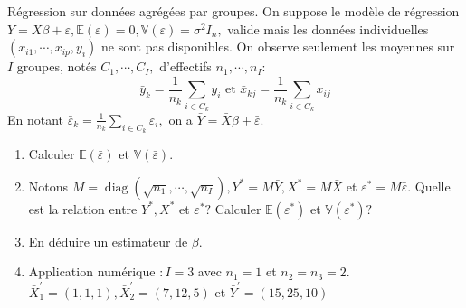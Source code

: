 \documentclass{td_um}
\providecommand{\1}{\mathds{1}}
\begin{document}
\cor{\newpage}

\exo{} Régression sur données agrégées par groupes. On suppose le modèle de régression $Y=X \beta+\varepsilon, \mathbb{E}(\varepsilon)=0, \mathbb{V}(\varepsilon)=\sigma^{2} I_{n},$ valide
mais les données individuelles $\left(x_{i 1}, \cdots, x_{i p}, y_{i}\right)$ ne sont pas disponibles. On observe seulement les moyennes sur $I$ groupes, notés $C_{1}, \cdots, C_{I},$ d'effectifs $n_{1}, \cdots, n_{I}:$
$$
\bar{y}_{k}=\frac{1}{n_{k}} \sum_{i \in C_{k}} y_{i} \text { et } \bar{x}_{k j}=\frac{1}{n_{k}} \sum_{i \in C_{k}} x_{i j}
$$
En notant $\bar{\varepsilon}_{k}=\frac{1}{n_{k}} \sum_{i \in C_{k}} \varepsilon_{i},$ on a $\bar{Y}=\bar{X} \beta+\bar{\varepsilon} .$
\begin{enumerate}
    \item  Calculer $\mathbb{E}(\bar{\varepsilon})$ et $\mathbb{V}(\bar{\varepsilon})$.
    \item  Notons $M=\operatorname{diag}\left(\sqrt{n_{1}}, \cdots, \sqrt{n_{I}}\right), Y^{*}=M \bar{Y}, X^{*}=M \bar{X}$ et $\varepsilon^{*}=M \bar{\varepsilon}$. Quelle est la relation entre $Y^{*}, X^{*}$ et $\varepsilon^{*} ?$ Calculer $\mathbb{E}\left(\varepsilon^{*}\right)$ et $\mathbb{V}\left(\varepsilon^{*}\right) ?$
    \item  En déduire un estimateur de $\beta$.
    \item  Application numérique $: I=3$ avec $n_{1}=1$ et $n_{2}=n_{3}=2$. $\bar{X}_{1}^{\prime}=(1,1,1), \bar{X}_{2}^{\prime}=(7,12,5)$ et $\bar{Y}^{\prime}=(15,25,10)$
\end{enumerate}
\end{document}

